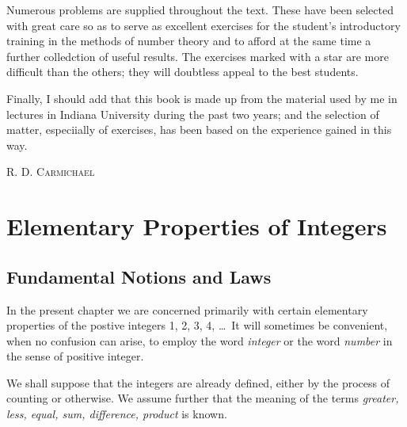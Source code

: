 \documentclass[oneside,12pt]{book}
\begin{document}
Numerous problems are supplied throughout the text. These have been selected with great care so as to serve as excellent exercises for the student's introductory training in the methods of number theory and to afford at the same time a further colledction of useful results. The exercises marked with a star are more difficult than the others; they will doubtless appeal to the best students. \par 

Finally, I should add that this book is made up from the material used by me in lectures in Indiana University during the past two years; and the selection of matter, especiially of exercises, has been based on the experience gained in this way. \par 

\begin{flushright}
    \textsc{R. D. Carmichael}
\end{flushright}

\tableofcontents

\mainmatter

\chapter{Elementary Properties of Integers}
\section{Fundamental Notions and Laws}
In the present chapter we are concerned primarily with certain elementary properties of the postive integers 1, 2, 3, 4, \dots\  It will sometimes be convenient, when no confusion can arise, to employ the word \textit{integer} or the word \textit{number} in the sense of positive integer. \par 

We shall suppose that the integers are already defined, either by the process of counting or otherwise. We assume further that the meaning of the terms \textit{greater, less, equal, sum, difference, product} is known. \par 
\end{document}
